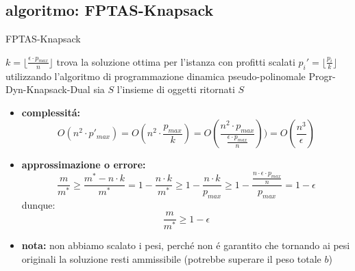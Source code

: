 
\subsection*{algoritmo: FPTAS-Knapsack}
\begin{flushleft}
	\begin{algorithm}
		\caption{FPTAS-Knapsack}
		\begin{algorithmic}
			\STATE $k=\lfloor\frac{\epsilon\cdot p_{max}}{n}\rfloor$
			\STATE trova la soluzione ottima per l'istanza con profitti scalati $p_i'=\lfloor\frac{p_i}{k}\rfloor$ utilizzando l'algoritmo di programmazione dinamica pseudo-polinomale Progr-Dyn-Knapsack-Dual
			\STATE sia $S$ l'insieme di oggetti ritornati
			\RETURN $S$
		\end{algorithmic}
	\end{algorithm}
	\begin{itemize}
		\item \textbf{complessit\'a:}
			$$O(n^2\cdot p'_{max})=O(n^2\cdot\frac{p_{max}}{k})=O(\frac{n^2\cdot p_{max}}{\frac{\epsilon\cdot p_{max}}{n}}))=O(\frac{n^3}{\epsilon})$$
		\item \textbf{approssimazione o errore:}
			$$\frac{m}{m^*}\geq\frac{m^*-n\cdot k}{m^*}=1-\frac{n\cdot k}{m^*}\geq 1-\frac{n\cdot k}{p_{max}}\geq 1-\frac{\frac{n\cdot\epsilon\cdot p_{max}}{n}}{p_{max}}=1-\epsilon$$
		dunque:
			$$\frac{m}{m^*}\geq 1-\epsilon$$
		\item \textbf{nota:} non abbiamo scalato i pesi, perch\'e non \'e garantito che tornando ai
			pesi originali la soluzione resti ammissibile (potrebbe superare il peso totale $b$)
	\end{itemize}
\end{flushleft}


